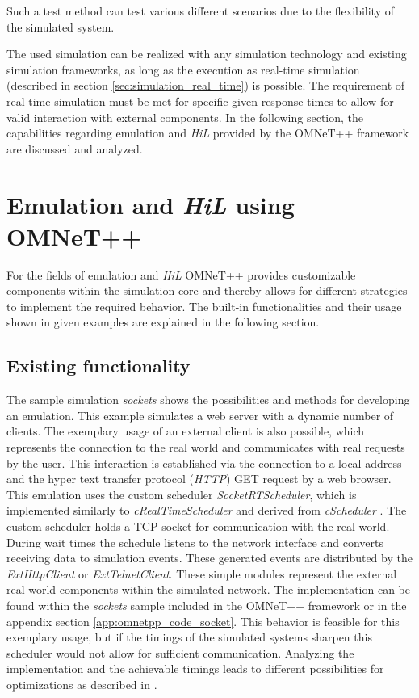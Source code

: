 Such a test method can test various different scenarios due to the flexibility of the simulated system.
\cite[section I]{lu_low-cost_2007}

The used simulation can be realized with any simulation technology and existing simulation frameworks, as long as the execution as real-time simulation (described in section \ref{sec:simulation_real_time}) is possible.
The requirement of real-time simulation must be met for specific given response times to allow for valid interaction with external components.
In the following section, the capabilities regarding emulation and \emph{HiL} provided by the OMNeT++ framework are discussed and analyzed.

\section{Emulation and \emph{HiL} using OMNeT++}
\label{sec:emulation_omnet}
For the fields of emulation and \emph{HiL} OMNeT++ provides customizable components within the simulation core and thereby allows for different strategies to implement the required behavior.
The built-in functionalities and their usage shown in given examples are explained in the following section.

\subsection{Existing functionality}
\label{sec:emulation_omnet_existing}

The sample simulation \emph{sockets} shows the possibilities and methods for developing an emulation.
This example simulates a web server with a dynamic number of clients.
The exemplary usage of an external client is also possible, which represents the connection to the real world and communicates with real requests by the user.
This interaction is established via the connection to a local address and the hyper text transfer protocol (\emph{HTTP}) GET request by a web browser.
This emulation uses the custom scheduler \emph{SocketRTScheduler}, which is implemented similarly to \emph{cRealTimeScheduler} and derived from \emph{cScheduler}  \cite{omnet_api}.
The custom scheduler holds a TCP socket for communication with the real world.
During wait times the schedule listens to the network interface and converts receiving data to simulation events.
These generated events are distributed by the \emph{ExtHttpClient} or \emph{ExtTelnetClient}.
These simple modules represent the external real world components within the simulated network.
The implementation can be found within the \emph{sockets} sample included in the OMNeT++ framework or in the appendix section \ref{app:omnetpp_code_socket}.
This behavior is feasible for this exemplary usage, but if the timings of the simulated systems sharpen this scheduler would not allow for sufficient communication.
Analyzing the implementation and the achievable timings leads to different possibilities for optimizations as described in \cite{scussel_improvements_2015}.

